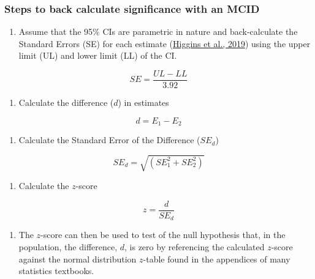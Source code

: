 \documentclass[]{cik}%
\begin{document}
\hypertarget{steps-to-back-calculate-significance-with-an-mcid}{%
\subsubsection{Steps to back calculate significance with an
MCID}\label{steps-to-back-calculate-significance-with-an-mcid}}

\begin{enumerate}
\def\labelenumi{\arabic{enumi}.}
\tightlist
\item
  Assume that the 95\% CIs are parametric in nature and back-calculate
  the Standard Errors (SE) for each estimate
  (\protect\hyperlink{ref-cochrane6}{Higgins et al., 2019}) using the
  upper limit (UL) and lower limit (LL) of the CI.
\end{enumerate}

\[
SE = \frac{UL-LL}{3.92}
\]

\begin{enumerate}
\def\labelenumi{\arabic{enumi}.}
\setcounter{enumi}{1}
\tightlist
\item
  Calculate the difference (\(d\)) in estimates
\end{enumerate}

\[
d = E_1 - E_2
\]

\begin{enumerate}
\def\labelenumi{\arabic{enumi}.}
\setcounter{enumi}{2}
\tightlist
\item
  Calculate the Standard Error of the Difference (\(SE_d\))
\end{enumerate}

\[
SE_d = \sqrt{(SE_1^2 + SE_2^2)}
\]

\begin{enumerate}
\def\labelenumi{\arabic{enumi}.}
\setcounter{enumi}{3}
\tightlist
\item
  Calculate the \(z\)-score
\end{enumerate}

\[
z = \frac{d }{ SE_d}
\]

\begin{enumerate}
\def\labelenumi{\arabic{enumi}.}
\setcounter{enumi}{4}
\tightlist
\item
  The \(z\)-score can then be used to test of the null hypothesis that,
  in the population, the difference, \(d\), is zero by referencing the
  calculated \(z\)-score against the normal distribution \(z\)-table
  found in the appendices of many statistics textbooks.
\end{enumerate}
\end{document}
